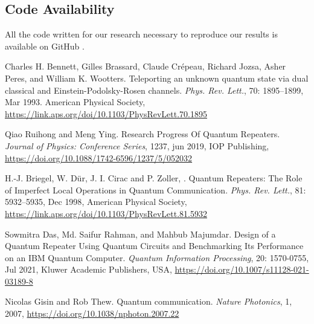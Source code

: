 \documentclass[11pt]{article}
\begin{document}
\subsection*{Code Availability}
All the code written for our research necessary to reproduce our results is available on GitHub \cite{karokigithub}.






\begin{thebibliography}{00}
    {Charles H. Bennett, Gilles Brassard, Claude Cr\'epeau, Richard Jozsa, Asher Peres, and  William K. Wootters}.
    {Teleporting an unknown quantum state via dual classical and Einstein-Podolsky-Rosen channels}.
    {\sl Phys. Rev. Lett.},
    {70}:
    {1895--1899},
    {Mar}
    {1993}.
    {American Physical Society},
    {\url{https://link.aps.org/doi/10.1103/PhysRevLett.70.1895}}

    {Qiao Ruihong and Meng Ying}.
    {Research Progress Of Quantum Repeaters}.
    {\sl Journal of Physics: Conference Series},
    {1237},
    {jun}
    {2019},
    {{IOP} Publishing},
    {\url{https://doi.org/10.1088/1742-6596/1237/5/052032}}

    {H.-J. Briegel, W. D\"ur, J. I. Cirac and P. Zoller, }.
    {Quantum Repeaters: The Role of Imperfect Local Operations in Quantum Communication}.
    {\sl Phys. Rev. Lett.},
    {81}:
    {5932--5935},
    {Dec}
    {1998},
    {American Physical Society},
    {\url{https://link.aps.org/doi/10.1103/PhysRevLett.81.5932}}

    {Sowmitra Das, Md. Saifur Rahman, and Mahbub Majumdar}.
    {Design of a Quantum Repeater Using Quantum Circuits and Benchmarking Its Performance on an IBM Quantum Computer}.
    {\sl Quantum Information Processing},
    {20}:
    {1570-0755},
    {Jul 2021},
    {Kluwer Academic Publishers},
    {USA},
    {\url{https://doi.org/10.1007/s11128-021-03189-8}}

    {Nicolas Gisin and Rob Thew}.
    {Quantum communication}.
    {\sl Nature Photonics},
    {1},
    {2007},
    {\url{https://doi.org/10.1038/nphoton.2007.22}} 
    

\end{thebibliography}
\end{document}
